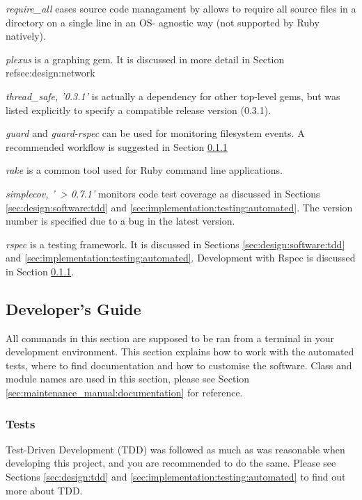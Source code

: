 \textit{require\_all} \parencite{Require+all} eases source code managament by
allows to require all source files in a directory on a single line in an OS-
agnostic way (not supported by Ruby natively).

\textit{plexus} \parencite{Plexus} is a graphing gem. It is discussed in more
detail in Section ref{sec:design:network}

\textit{thread\_safe, '0.3.1'} is actually a dependency for other top-level
gems, but was listed explicitly to specify a compatible release version
(0.3.1).

\textit{guard} and \textit{guard-rspec} \parencite{Guard} can be used for
monitoring filesystem events. A recommended workflow is suggested in Section
\ref{sec:maintenance_manual:testing}

\textit{rake} \parencite{Rake} is a common tool used for Ruby command line
applications.

\textit{simplecov, '~> 0.7.1'} \parencite{Simplecov} monitors code test
coverage as discussed in Sections \ref{sec:design:software:tdd} and
\ref{sec:implementation:testing:automated}. The version number is specified due
to a bug in the latest version.

\textit{rspec} \parencite{Rspec} is a testing framework. It is discussed in
Sections \ref{sec:design:software:tdd} and
\ref{sec:implementation:testing:automated}. Development with Rspec is discussed
in Section \ref{sec:maintenance_manual:testing}.


\subsection{Developer's Guide}
\label{sec:maintenance_manual:developing}

All commands in this section are supposed to be ran from a terminal in your
development environment. This section explains how to work with the automated
tests, where to find documentation and how to customise the software. Class and
module names are used in this section, please see Section
\ref{sec:maintenance_manual:documentation} for reference.


\subsubsection{Tests}

\label{sec:maintenance_manual:testing}

Test-Driven Development (TDD) was followed as much as was reasonable when
developing this project, and you are recommended to do the same. Please see
Sections \ref{sec:design:tdd} and \ref{sec:implementation:testing:automated} to
find out more about TDD.

